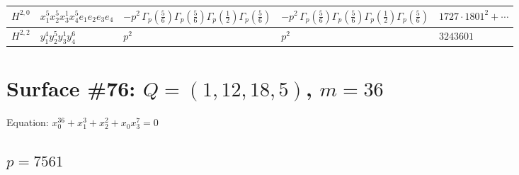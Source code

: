 \documentclass[11pt]{article}
\begin{document}
\begin{table}[ht]
{\begin{tabular}{@{}lllll@{}}
\midrule
$H^{2,0}$ & $x_{1}^{5} x_{2}^{5} x_{3}^{1} x_{4}^{5}  e_{1} e_{2} e_{3} e_{4}$ & $- p^{2} \, \Gamma_p \left( \frac{5}{6} \right) \Gamma_p \left( \frac{5}{6} \right) \Gamma_p \left( \frac{1}{2} \right) \Gamma_p \left( \frac{5}{6} \right)$ & $- p^{2} \, \Gamma_p \left( \frac{5}{6} \right) \Gamma_p \left( \frac{5}{6} \right) \Gamma_p \left( \frac{1}{2} \right) \Gamma_p \left( \frac{5}{6} \right)$ & $1727{\cdot}1801^{2}{+}\cdots$ \\
\midrule
$H^{2,2}$ & $y_{1}^{4} y_{2}^{5} y_{3}^{1} y_{4}^{6}$ & $p^{2} \,$ & $p^{2} \,$ & $3243601$ \\
\bottomrule
\end{tabular}
}
\renewcommand{\arraystretch}{1.0}
\end{table}

\newpage

\section*{Surface \#76: $Q=(1, 12, 18, 5)$, $m=36$}

Equation: $x_0^{36} + x_1^{3} + x_2^{2} + x_0 x_3^{7} = 0$

\subsection*{$p = 7561$}
\end{document}
